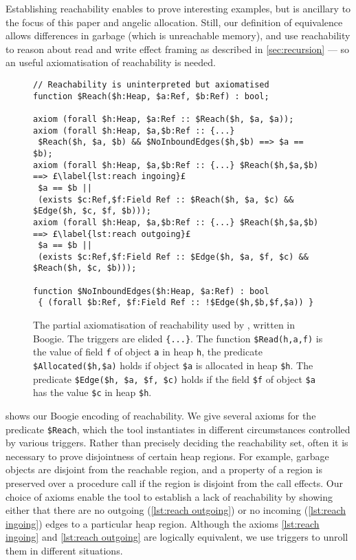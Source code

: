 \documentclass[runningheads,a4paper]{llncs}
\begin{document}
Establishing reachability enables \tool{} to prove interesting examples, but is ancillary to the focus of this paper \metho{} and angelic allocation. Still, our definition of equivalence allows differences in garbage (which is unreachable memory), and \tool{} use reachability to reason about read and write effect framing as described in \cref{sec:recursion} --- so an useful axiomatisation of reachability is needed.

\begin{figure}[htbp]%
\centering%
\noindent\begin{lstlisting}[style=Boogie,firstnumber=auto,name=copyex]
// Reachability is uninterpreted but axiomatised
function $Reach($h:Heap, $a:Ref, $b:Ref) : bool;

axiom (forall $h:Heap, $a:Ref :: $Reach($h, $a, $a));
axiom (forall $h:Heap, $a,$b:Ref :: {...} 
 $Reach($h, $a, $b) && $NoInboundEdges($h,$b) ==> $a == $b);
axiom (forall $h:Heap, $a,$b:Ref :: {...} $Reach($h,$a,$b) ==> £\label{lst:reach ingoing}£
 $a == $b || 
 (exists $c:Ref,$f:Field Ref :: $Reach($h, $a, $c) && $Edge($h, $c, $f, $b)));
axiom (forall $h:Heap, $a,$b:Ref :: {...} $Reach($h,$a,$b) ==> £\label{lst:reach outgoing}£
 $a == $b || 
 (exists $c:Ref,$f:Field Ref :: $Edge($h, $a, $f, $c) && $Reach($h, $c, $b)));

function $NoInboundEdges($h:Heap, $a:Ref) : bool 
 { (forall $b:Ref, $f:Field Ref :: !$Edge($h,$b,$f,$a)) }
\end{lstlisting}
\caption{The partial axiomatisation of reachability used by \tool{}, written in Boogie. The triggers are elided \texttt{\{...\}}. The function \texttt{\$Read(h,a,f)} is the value of field \texttt{f} of object \texttt{a} in heap \texttt{h}, the predicate \texttt{\$Allocated(\$h,\$a)} holds if object \texttt{\$a} is allocated in heap \texttt{\$h}. The predicate \texttt{\$Edge(\$h, \$a, \$f, \$c)} holds if the field \texttt{\$f} of object \texttt{\$a} has the value \texttt{\$c} in heap \texttt{\$h}.\label{fig:reachability}}
\end{figure}
 shows our Boogie encoding of reachability. We give several axioms for the predicate \texttt{\$Reach}, which the tool instantiates in different circumstances controlled by various triggers. Rather than precisely deciding the reachability set, often it is necessary to prove disjointness of certain heap regions. For example, garbage objects are disjoint from the reachable region, and a property of a region is preserved over a procedure call if the region is disjoint from the call effects. Our choice of axioms enable the tool to establish a lack of reachability by showing either that there are no outgoing (\cref{lst:reach outgoing}) or no incoming (\cref{lst:reach ingoing}) edges to a particular heap region. Although the axioms \cref{lst:reach ingoing} and \cref{lst:reach outgoing} are logically equivalent, we use triggers to unroll them in different situations. 
\end{document}
